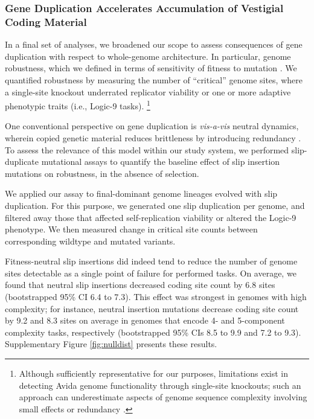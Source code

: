 \subsubsection{Gene Duplication Accelerates Accumulation of Vestigial Coding Material}



In a final set of analyses, we broadened our scope to assess consequences of gene duplication with respect to whole-genome architecture.
In particular, genome robustness, which we defined in terms of sensitivity of fitness to mutation \citep{lenski1999genome}.
We quantified robustness by measuring the number of ``critical'' genome sites, where a single-site knockout underrated replicator viability or one or more adaptive phenotypic traits (i.e., Logic-9 tasks).
\footnote{%
Although sufficiently representative for our purposes, limitations exist in detecting Avida genome functionality through single-site knockouts; such an approach can underestimate aspects of genome sequence complexity involving small effects or redundancy \citep{lenski1999genome,moreno2024cryptic}.
}

One conventional perspective on gene duplication is \textit{vis-a-vis} neutral dynamics, wherein copied genetic material reduces brittleness by introducing redundancy \citep{wagner1996genetic}.
To assess the relevance of this model within our study system, we performed slip-duplicate mutational assays to quantify the baseline effect of slip insertion mutations on robustness, in the absence of selection.

We applied our assay to final-dominant genome lineages evolved with slip duplication.
For this purpose, we generated one slip duplication per genome, and filtered away those that affected self-replication viability or altered the Logic-9 phenotype.
We then measured change in critical site counts between corresponding wildtype and mutated variants.

Fitness-neutral slip insertions did indeed tend to reduce the number of genome sites detectable as a single point of failure for performed tasks.
On average, we found that neutral slip insertions decreased coding site count by 6.8 sites (bootstrapped 95\% CI 6.4 to 7.3).
This effect was strongest in genomes with high complexity; for instance, neutral insertion mutations decrease coding site count by 9.2 and 8.3 sites on average in genomes that encode 4- and 5-component complexity tasks, respectively (bootstrapped 95\% CIs 8.5 to 9.9 and 7.2 to 9.3).
Supplementary Figure \ref{fig:nulldist} presents these results.

